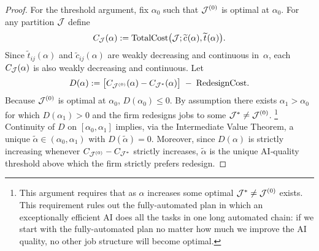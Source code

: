 \documentclass{article}
\theoremstyle{plain}
\theoremstyle{plain}
\begin{document}
\begin{proof}
For the threshold argument, fix $\alpha_0$ such that $\mathcal{J}^{(0)}$ is optimal at $\alpha_0$.
For any partition $\mathcal{J}$ define
\[
C_{\mathcal{J}}(\alpha)
:=
\mathrm{TotalCost}\bigl(\mathcal{J}; \widetilde{c_{}}(\alpha), \widetilde{t_{}}(\alpha)\bigr).
\]
Since $\widetilde t_{ij}(\alpha)$ and $\widetilde c_{ij}(\alpha)$ are weakly decreasing and continuous in~$\alpha$, each $C_{\mathcal{J}}(\alpha)$ is also weakly decreasing and continuous.
Let
\[
D(\alpha)
:=
\bigl[C_{\mathcal{J}^{(0)}}(\alpha)-C_{\mathcal{J}^*}(\alpha)\bigr]
\;-\;
\mathrm{RedesignCost}.
\]
Because $\mathcal{J}^{(0)}$ is optimal at $\alpha_0$, $D(\alpha_0)\le0$.  
By assumption there exists $\alpha_1>\alpha_0$ for which $D(\alpha_1)>0$ and the firm redesigns jobs to some $\mathcal{J}^{*} \neq \mathcal{J}^{(0)}$.  
\footnote{This argument requires that as $\alpha$ increases some optimal $\mathcal{J}^{*} \neq \mathcal{J}^{(0)}$ exists.
This requirement rules out the fully-automated plan in which an exceptionally efficient AI does all the tasks in one long automated chain: if we start with the fully-automated plan no matter how much we improve the AI quality, no other job structure will become optimal.}
Continuity of $D$ on $[\alpha_0,\alpha_1]$ implies, via the Intermediate Value Theorem, a unique $\tilde\alpha\in(\alpha_0,\alpha_1)$ with $D(\tilde\alpha)=0$.  
Moreover, since $D(\alpha)$ is strictly increasing whenever $C_{\mathcal{J}^{(0)}}-C_{\mathcal{J}^*}$ strictly increases, $\tilde\alpha$ is the unique AI‐quality threshold above which the firm strictly prefers redesign.
\end{proof}
\end{document}
